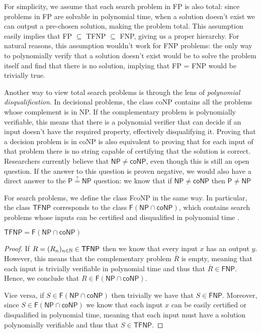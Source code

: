 For simplicity, we assume that each search problem in \textsf{FP} is also total: since problems in \textsf{FP} are solvable in polynomial time, when a solution doesn't exist we can output a pre-chosen  solution, making the problem total. This assumption easily implies that \textsf{FP} $\subseteq$ \textsf{TFNP} $\subseteq$ \textsf{FNP}, giving us a proper hierarchy. For natural reasons, this assumption wouldn't work for \textsf{FNP} problems: the only way to polynomially verify that a solution doesn't exist would be to solve the problem itself and find that there is no solution, implying that \textsf{FP} = \textsf{FNP} would be trivially true.

Another way to view total search problems is through the lens of \textit{polynomial disqualification}. In decisional problems, the class \textsf{coNP} contains all the problems whose complement is in \textsf{NP}. If the complementary problem is polynomially verifiable, this means that there is a polynomial verifier that can decide if an input doesn't have the required property, effectively disqualifying it. Proving that a decision problem is in \textsf{coNP} is also equivalent to proving that for each input of that problem there is no string capable of certifying that the solution is correct. Researchers currently believe that $\mathsf{NP} \neq \mathsf{coNP}$, even though this is still an open question. If the answer to this question is proven negative, we would also have a direct answer to the $\mathsf{P} \stackrel{?}{=} \mathsf{NP}$ question: we know that if $\mathsf{NP} \neq \mathsf{coNP}$ then $\mathsf{P} \neq \mathsf{NP}$ \cite{complexity_arora_barak, sipser_computation}

For search problems, we define the class \textsf{FcoNP} in the same way. In particular, the class $\textsf{TFNP}$ corresponds to the class $\mathsf{F}(\mathsf{NP} \cap \mathsf{coNP})$, which contains search problems whose inputs can be certified and disqualified in polynomial time \cite{tfnp_f_np_conp}.

\begin{proposition}
    \label{tfnp_f_np_conp}
    $\mathsf{TFNP} = \mathsf{F}(\mathsf{NP} \cap \mathsf{coNP})$
\end{proposition}

\begin{proof}
 If $R = (R_n)_{n \in \mathbb{N}} \in \textsf{TFNP}$ then we know that every input $x$ has an output $y$. However, this means that the complementary problem $\overline{R}$ is empty, meaning that each input is trivially verifiable in polynomial time and thus that $\overline{R} \in \textsf{FNP}$. Hence, we conclude that $R \in \mathsf{F}(\mathsf{NP} \cap \mathsf{coNP})$.
    
 Vice versa, if $S \in \mathsf{F}(\mathsf{NP} \cap \mathsf{coNP})$ then trivially we have that $S \in \mathsf{FNP}$. Moreover, since $S \in \mathsf{F}(\mathsf{NP} \cap \mathsf{coNP})$ we know that each input $x$ can be easily certified or disqualified in polynomial time, meaning that each input must have a solution polynomially verifiable and thus that $S \in \mathsf{TFNP}$.

\end{proof}

